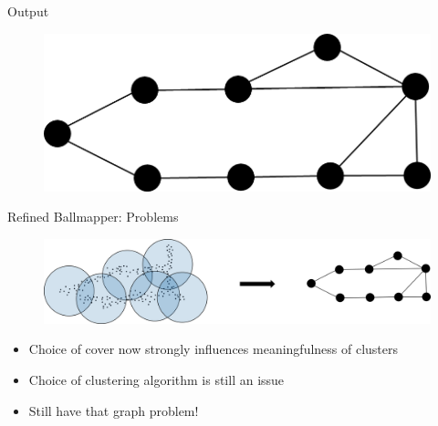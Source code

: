 \documentclass{beamer}
\begin{document}
\begin{frame}{Output}
\begin{figure}
  \begin{center}
    \includegraphics[width=1\textwidth]{rballmapper.png}
  \end{center}
\end{figure}
\end{frame}
  
\begin{frame}{Refined Ballmapper: Problems}
  \begin{figure}
    \begin{center}
      \includegraphics[width=1\textwidth]{rbmarrow.png}
    \end{center}
  \end{figure}
  \begin{itemize}
    \item Choice of cover now strongly influences meaningfulness of clusters
    \item Choice of clustering algorithm is still an issue
    \item Still have that graph problem!
  \end{itemize}
\end{frame}
\end{document}
